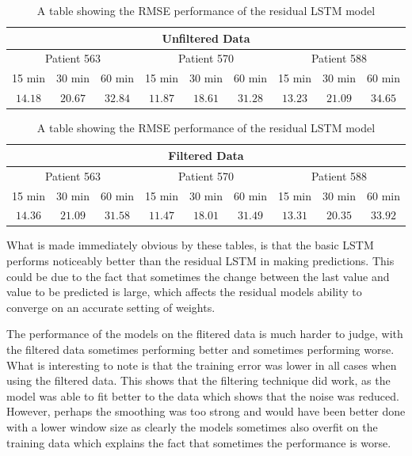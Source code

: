       \begin{table}[H]
        \centering
        \caption{A table showing the RMSE performance of the residual LSTM model}
        \begin{tabular}{|*{9}{c|}} 
          \hline
          \multicolumn{9}{|c|}{Unfiltered Data} \\ \hline
          \multicolumn{3}{|c}{Patient 563} & \multicolumn{3}{|c}{Patient 570} & \multicolumn{3}{|c|}{Patient 588} \\ \hline 
          15 min & 30 min & 60 min &15 min & 30 min & 60 min &15 min & 30 min & 60 min \\ \hline
          $14.18$&$20.67$ &$32.84$ &$11.87$ &$18.61$ & $31.28$&$13.23$ &$21.09$ &$34.65$ \\ \hline
        \end{tabular}
        \begin{tabular}{|*{9}{c|}} 
          \hline
          \multicolumn{9}{|c|}{Filtered Data} \\ \hline
          \multicolumn{3}{|c}{Patient 563} & \multicolumn{3}{|c}{Patient 570} & \multicolumn{3}{|c|}{Patient 588} \\ \hline 
          15 min & 30 min & 60 min &15 min & 30 min & 60 min &15 min & 30 min & 60 min \\ \hline
          $14.36$ &$21.09$ &$31.58$ &$11.47$ &$18.01$ &$31.49$ &$13.31$ &$20.35$ &$33.92$ \\ \hline
        \end{tabular}
      \end{table}

      What is made immediately obvious by these tables, is that the basic LSTM performs noticeably better than the residual LSTM in making predictions. This could be due to the fact that sometimes the change between the last value and value to be predicted is large, which affects the residual models ability to converge on an accurate setting of weights.

      The performance of the models on the flitered data is much harder to judge, with the filtered data sometimes performing better and sometimes performing worse. What is interesting to note is that the training error was lower in all cases when using the filtered data. This shows that the filtering technique did work, as the model was able to fit better to the data which shows that the noise was reduced. However, perhaps the smoothing was too strong and would have been better done with a lower window size as clearly the models sometimes also overfit on the training data which explains the fact that sometimes the performance is worse. 


